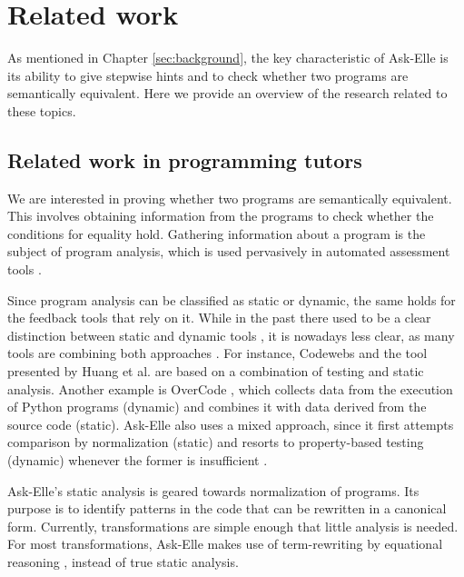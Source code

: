 \chapter{Related work}
\label{sec:related-work}

As mentioned in Chapter \ref{sec:background}, the key characteristic of Ask-Elle is its ability to give stepwise hints and to check whether two programs are semantically equivalent. Here we provide an overview of the research related to these topics.

\section{Related work in programming tutors}

We are interested in proving whether two programs are semantically equivalent. This involves obtaining information from the programs to check whether the conditions for equality hold. Gathering information about a program is the subject of program analysis, which is used pervasively in automated assessment tools \cite{2016feedbackreview}.

Since program analysis can be classified as static or dynamic, the same holds for the feedback tools that rely on it. While in the past there used to be a clear distinction between static and dynamic tools \cite{2005alasurvey}, it is nowadays less clear, as many tools are combining both approaches \cite{2016feedbackreview}. For instance, Codewebs \cite{2014codewebs} and the tool presented by Huang et al. \cite{2013huang} are based on a combination of testing and static analysis. Another example is OverCode \cite{2015overcode}, which collects data from the execution of Python programs (dynamic) and combines it with data derived from the source code (static). Ask-Elle also uses a mixed approach, since it first attempts comparison by normalization (static) and resorts to property-based testing (dynamic) whenever the former is insufficient \cite{2010askelle}.

Ask-Elle's static analysis is geared towards normalization of programs. Its purpose is to identify patterns in the code that can be rewritten in a canonical form. Currently, transformations are simple enough that little analysis is needed. For most transformations, Ask-Elle makes use of term-rewriting by equational reasoning \cite{1998termrewriting}, instead of true static analysis.


